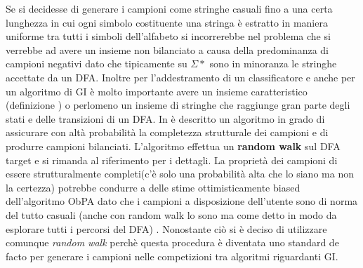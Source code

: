 Se si decidesse di generare  i campioni come stringhe casuali fino a una certa lunghezza in cui ogni simbolo costituente una stringa è estratto in maniera uniforme tra tutti i simboli dell'alfabeto si  incorrerebbe nel problema che  si verrebbe ad avere un insieme non bilanciato a causa della predominanza di campioni negativi dato che tipicamente su $\Sigma*$ sono in minoranza le stringhe accettate da un \ac{DFA}. 
Inoltre  per l'addestramento di un classificatore e anche per un algoritmo di \ac{GI} è molto importante avere un insieme caratteristico (definizione \label{def:car}) o perlomeno un insieme di stringhe che raggiunge gran parte degli stati e delle transizioni di un \ac{DFA}.
In \cite{Stamina10} è descritto un algoritmo in grado di assicurare con altà probabilità la completezza strutturale dei campioni e di produrre campioni bilanciati. L'algoritmo effettua un \textbf{random walk} sul \ac{DFA} target e si rimanda al riferimento per i dettagli.
La proprietà dei campioni di essere strutturalmente completi(c'è solo una probabilità alta che lo siano ma non la certezza) potrebbe condurre a delle stime ottimisticamente biased dell'algoritmo \ac{ObPA} dato che i campioni a disposizione dell'utente sono di norma del tutto casuali (anche con random walk lo sono ma come detto in modo da esplorare tutti i percorsi del \ac{DFA})  . Nonostante ciò si è deciso  di utilizzare comunque \textit{random walk}  perchè  questa procedura è diventata uno standard de facto per generare i campioni nelle competizioni tra algoritmi riguardanti \ac{GI}.

